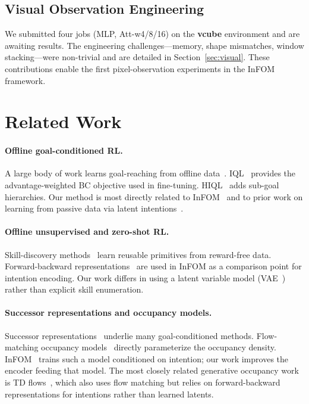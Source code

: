 \documentclass{article}
\newcommand{\base}{InFOM}
\begin{document}
\subsection{Visual Observation Engineering}
\label{sec:visual_exp}

We submitted four jobs (MLP, Att-w4/8/16) on the
\textbf{vcube} environment and are awaiting results.
The engineering challenges—memory, shape mismatches, window
stacking—were non-trivial and are detailed in
Section~\ref{sec:visual}.
These contributions enable the first pixel-observation
experiments in the \base{} framework.

\section{Related Work}
\label{sec:related}

\paragraph{Offline goal-conditioned RL.}
A large body of work learns goal-reaching from offline
data~\cite{ghosh2021gcsl,yang2021wgcsl,park2023hiql,
eysenbach2022contrastive,zheng2024stabilizing,park2025ogbench}.
IQL~\cite{kostrikov2021iql} provides the advantage-weighted
BC objective used in fine-tuning.
HIQL~\cite{park2023hiql} adds sub-goal hierarchies.
Our method is most directly related to
\base{}~\cite{zheng2025infom} and to prior work on
learning from passive data via latent
intentions~\cite{ghosh2023passive}.

\paragraph{Offline unsupervised and zero-shot RL.}
Skill-discovery methods~\cite{touati2021fb,park2024hilp,
eysenbach2018diayn,sharma2019dads} learn
reusable primitives from reward-free data.
Forward-backward representations~\cite{touati2021fb,
touati2023does} are used in \base{}
as a comparison point for intention encoding.
Our work differs in using a latent variable model
(VAE~\cite{kingma2013vae}) rather than explicit skill
enumeration.

\paragraph{Successor representations and occupancy models.}
Successor representations~\cite{dayan1993successor,
barreto2017sf,barreto2018transfer} underlie many
goal-conditioned methods.
Flow-matching occupancy
models~\cite{farebrother2025tdflows,park2025flowq,
dong2025valueflows} directly parameterize the occupancy
density.
\base{}~\cite{zheng2025infom} trains such a model
conditioned on intention; our work improves the encoder
feeding that model.
The most closely related generative occupancy work is
TD flows~\cite{farebrother2025tdflows}, which also uses
flow matching but relies on forward-backward representations
for intentions rather than learned latents.
\end{document}
